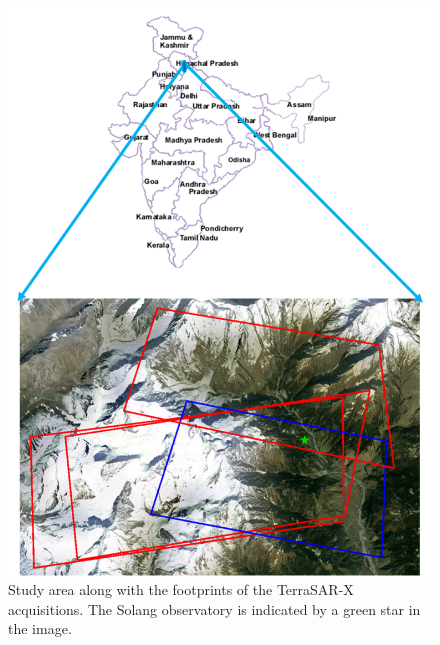 \begin{figure}[!htbp]
	\centering
	\includegraphics[width=\columnwidth]{Figures/study_area_sw_dual}
	\caption{Study area along with the footprints of the TerraSAR-X acquisitions. The Solang observatory is indicated by a green star in the image.}
	\label{fig:study_area_dual_pol}
\end{figure}
